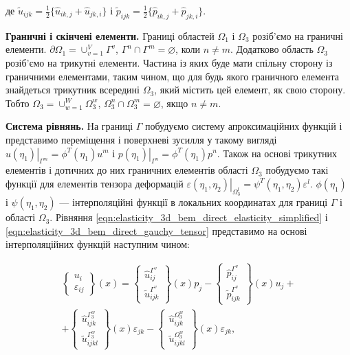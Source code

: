 \noindent де $\tilde{u}_{ijk} = \frac{1}{2} \{ \hat{u}_{ik,j} + \hat{u}_{jk,i} \} $ і 
$\tilde{p}_{ijk} = \frac{1}{2} \{ \hat{p}_{ik,j} + \hat{p}_{jk,i} \}$.

\textbf{Граничні і скінчені елементи.} Границі областей $\Omega_1$ і $\Omega_3$ розіб'ємо на граничні елементи. 
$\partial\Omega_1 = \cup_{v=1}^{V}\Gamma^v$, $\Gamma^n \cap \Gamma^m = \varnothing$, коли $n \neq m$. 
Додатково область $\Omega_3$ розіб'ємо на трикутні елементи. Частина із яких буде мати спільну сторону із 
граничними елементами, таким чином, що для будь якого граничного елемента знайдеться трикутник всередині $\Omega_3$, 
який містить цей елемент, як свою сторону. Тобто $\Omega_3 = \cup_{w=1}^{W} \Omega_3^w$, 
$\Omega_3^n \cap \Omega_3^m = \varnothing$, якщо $n \neq m$. 

\textbf{Система рівнянь.} На границі $\Gamma$ побудуємо систему апроксимаційних функцій і представимо переміщення і 
поверхневі зусилля у такому вигляді $\left.u(\eta_1)\right|_{\Gamma^m} = \phi^T(\eta_1)u^m$ і 
$\left.p(\eta_1)\right|_{\Gamma^n} = \phi^T(\eta_1)p^n$. Також на основі трикутних елементів і дотичних до них граничних 
елементів області $\Omega_3$ побудуємо такі функції для елементів тензора деформацій 
$\left.\varepsilon(\eta_1, \eta_2)\right|_{\Omega_3^l} = \psi^T(\eta_1,\eta_2)\varepsilon^l$. $\phi(\eta_1)$ і 
$\psi(\eta_1, \eta_2)$ --- інтерполяційні функції в локальних координатах для границі $\Gamma$ і області $\Omega_3$. 
Рівняння \ref{eqn:elasticity_3d_bem_direct_elasticity_simplified} і \ref{eqn:elasticity_3d_bem_direct_gauchy_tensor} 
представимо на основі інтерполяційних функцій наступним чином:

\begin{equation}
    \begin{split}
        \left\{ \begin{array}{lr} u_i \\ \varepsilon_{ij}\end{array} \right\}(x) =  
        \left\{ \begin{array}{lr} \hat{u}_{ij}^{\Gamma^v} \\ \tilde{u}_{ijk}^{\Gamma^v} \end{array} \right\}(x) p_j -
        \left\{ \begin{array}{lr} \hat{p}_{ij}^{\Gamma^v} \\ \tilde{p}_{ijk}^{\Gamma^v} \end{array} \right\}(x) u_j + \\
        + \left\{ \begin{array}{lr} \hat{u}_{ijk}^{\Gamma_3^w} \\ \tilde{u}_{ijkl}^{\Gamma_3^w} \end{array} \right\}(x) 
        \varepsilon_{jk}  
        - \left\{ \begin{array}{lr} \hat{u}_{ijk}^{\Omega_3^w} \\ \tilde{u}_{ijkl}^{\Omega_3^w} \end{array} \right\}(x) 
        \varepsilon_{jk},  
    \end{split}
\end{equation}

